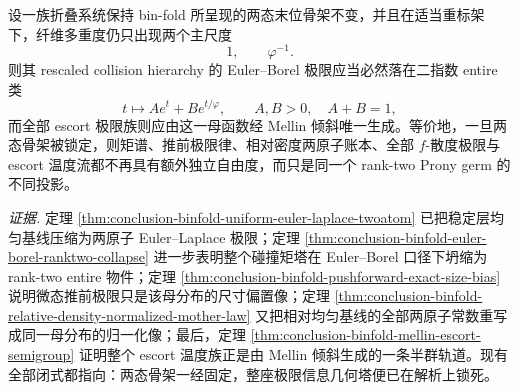 \begin{conjecture}\label{conj:conclusion-binfold-two-scale-euler-mellin-rigidity}
设一族折叠系统保持 bin-fold 所呈现的两态末位骨架不变，并且在适当重标架下，纤维多重度仍只出现两个主尺度
\[
1,\qquad \varphi^{-1}.
\]
则其 rescaled collision hierarchy 的 Euler--Borel 极限应当必然落在二指数 entire 类
\[
t\longmapsto A e^t+B e^{t/\varphi},
\qquad
A,B>0,\quad A+B=1,
\]
而全部 escort 极限族则应由这一母函数经 Mellin 倾斜唯一生成。等价地，一旦两态骨架被锁定，则矩谱、推前极限律、相对密度两原子账本、全部 \(f\)-散度极限与 escort 温度流都不再具有额外独立自由度，而只是同一个 rank-two Prony germ 的不同投影。
\end{conjecture}

\noindent\emph{证据.}
定理 \ref{thm:conclusion-binfold-uniform-euler-laplace-twoatom} 已把稳定层均匀基线压缩为两原子 Euler--Laplace 极限；定理 \ref{thm:conclusion-binfold-euler-borel-ranktwo-collapse} 进一步表明整个碰撞矩塔在 Euler--Borel 口径下坍缩为 rank-two entire 物件；定理 \ref{thm:conclusion-binfold-pushforward-exact-size-bias} 说明微态推前极限只是该母分布的尺寸偏置像；定理 \ref{thm:conclusion-binfold-relative-density-normalized-mother-law} 又把相对均匀基线的全部两原子常数重写成同一母分布的归一化像；最后，定理 \ref{thm:conclusion-binfold-mellin-escort-semigroup} 证明整个 escort 温度族正是由 Mellin 倾斜生成的一条半群轨道。现有全部闭式都指向：两态骨架一经固定，整座极限信息几何塔便已在解析上锁死。
